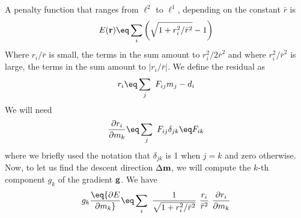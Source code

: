 \begin{comment}
\subsection{Multivariate $\ell^1$ estimation by iterated reweighting}
\sx{L1 or $\ell^1$}
\sx{L2 or $\ell^2$}
The easiest method of model fitting is linear least squares.
This means minimizing the sums of squares of residuals ($\ell^2$).
On the other hand, we often encounter huge noises
and it is much safer to minimize
the sums of absolute values of residuals
($\ell^1$).
(The problem with $\ell^0$ is that there are multiple minima,
so the gradient is not a sensible way to seek the deepest).

\par
There exist specialized techniques for handling $\ell^1$
multivariate fitting problems.
They should work better than the simple
iterative reweighting outlined here.
\end{comment}




\par
A penalty function that ranges from $\ell^2$ to $\ell^1$,
depending on the constant $\bar r$ is
\begin{equation}
E(\bold r) \eq \sum_i \left( \sqrt{1+r_i^2/\bar r^2} - 1 \right)
\label{eqn:L12penalty}
\end{equation}
Where
$r_i/\bar r$
is small, the terms in the sum amount to $r_i^2/2\bar r^2$
and where
$r_i^2/\bar r^2$
is large, the terms in the sum amount to $|r_i/\bar r|$.
We define the residual as
\begin{equation}
r_i \eq \sum_j \ F_{ij}m_j - d_i
\label{eqn:usualres}
\end{equation}
We will need
\begin{equation}
{\partial r_i\over\partial m_k}
\eq \sum_j \ F_{ij} \delta_{jk} \eq F_{ik}
\label{eqn:partialroverm}
\end{equation}
where we briefly used the notation that $\delta_{jk}$ is 1 when
$j=k$ and zero otherwise.
Now,
to let us find the descent direction $\Delta \bold m$,
we will compute
the $k$-th component $g_k$ of the gradient $\bold g$.
We have
\begin{equation}
g_k \eq
{\partial E \over\partial m_k}
\eq \sum_i \ {1\over\sqrt{1+r_i^2/\bar r^2}}\ 
{ r_i \over \bar r^2}
\ 
{\partial r_i\over\partial m_k}
\label{eqn:morel1}
\end{equation}

